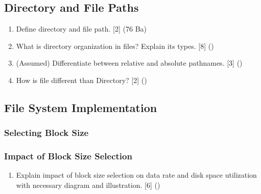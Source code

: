 \documentclass[12pt]{article}
\begin{document}
	\subsection{Directory and File Paths}
		\begin{enumerate}
			\item Define directory and file path. \hfill [2] (76 Ba)
			
			\item What is directory organization in files? Explain its types. \hfill [8] ()

			\item (Assumed) Differentiate between relative and absolute pathnames. \hfill [3] ()

			\item How is file different than Directory? \hfill [2] ()
		\end{enumerate}

	\subsection{File System Implementation}
		\subsubsection{Selecting Block Size}
		\subsubsection{Impact of Block Size Selection}
			\begin{enumerate}
				\item Explain impact of block size selection on data rate and disk space utilization with necessary diagram and illustration. \hfill [6] ()
			\end{enumerate}
\end{document}
